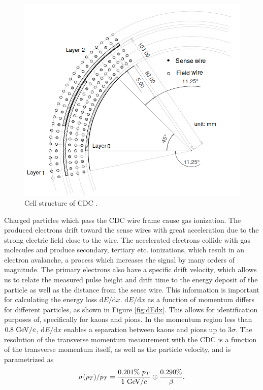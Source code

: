 \begin{figure}[H]
	\centering
	\captionsetup{width=0.8\linewidth}
	\includegraphics[width=0.6\linewidth]{fig/setup/CDC_layout}
	\caption{Cell structure of CDC \cite{ABASHIAN2002117}.}
	\label{fig:CDC_layout}
\end{figure}

Charged particles which pass the CDC wire frame cause gas ionization. The produced electrons drift toward the sense wires with great acceleration due to the strong electric field close to the wire. The accelerated electrons collide with gas molecules and produce secondary, tertiary etc. ionizations, which result in an electron avalanche, a process which increases the signal by many orders of magnitude. The primary electrons also have a specific drift velocity, which allows us to relate the measured pulse height and drift time to the energy deposit of the particle as well as the distance from the sense wire. This information is important for calculating the energy loss $\mathrm{d}E/\mathrm{d}x$. $\mathrm{d}E/\mathrm{d}x$ as a function of momentum differs for different particles, as shown in Figure \ref{fig:dEdx}. This allows for identification purposes of, specifically for kaons and pions. In the momentum region less than $0.8\mathrm{~GeV}/c$, $\mathrm{d}E/\mathrm{d}x$ enables a separation between kaons and pions up to $3\sigma$. The resolution of the transverse momentum measurement with the CDC is a function of the transverse momentum itself, as well as the particle velocity, and is parametrized as
\begin{equation}
\sigma(p_T)/p_T = \frac{0.201\%~p_T}{1\mathrm{~GeV}/c} \oplus \frac{0.290\%}{\beta}.
\end{equation}

